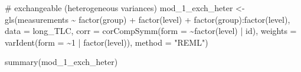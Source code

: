 \documentclass[
  letterpaper,
  DIV=11,
  numbers=noendperiod]{scrreprt}
\newenvironment{Shaded}{\begin{snugshade}}{\end{snugshade}}
\newcommand{\AttributeTok}[1]{\textcolor[rgb]{0.40,0.45,0.13}{#1}}
\newcommand{\CommentTok}[1]{\textcolor[rgb]{0.37,0.37,0.37}{#1}}
\newcommand{\DecValTok}[1]{\textcolor[rgb]{0.68,0.00,0.00}{#1}}
\newcommand{\FunctionTok}[1]{\textcolor[rgb]{0.28,0.35,0.67}{#1}}
\newcommand{\NormalTok}[1]{\textcolor[rgb]{0.00,0.23,0.31}{#1}}
\newcommand{\OtherTok}[1]{\textcolor[rgb]{0.00,0.23,0.31}{#1}}
\newcommand{\SpecialCharTok}[1]{\textcolor[rgb]{0.37,0.37,0.37}{#1}}
\newcommand{\StringTok}[1]{\textcolor[rgb]{0.13,0.47,0.30}{#1}}
\begin{document}
\begin{Shaded}
\begin{Highlighting}[]
\CommentTok{\# exchangeable (heterogeneous variances)}
\NormalTok{mod\_1\_exch\_heter }\OtherTok{\textless{}{-}} \FunctionTok{gls}\NormalTok{(measurements }\SpecialCharTok{\textasciitilde{}} \FunctionTok{factor}\NormalTok{(group) }\SpecialCharTok{+} \FunctionTok{factor}\NormalTok{(level) }\SpecialCharTok{+} \FunctionTok{factor}\NormalTok{(group)}\SpecialCharTok{:}\FunctionTok{factor}\NormalTok{(level),}
    \AttributeTok{data =}\NormalTok{ long\_TLC, }\AttributeTok{corr =} \FunctionTok{corCompSymm}\NormalTok{(}\AttributeTok{form =} \SpecialCharTok{\textasciitilde{}}\FunctionTok{factor}\NormalTok{(level) }\SpecialCharTok{|}\NormalTok{ id), }\AttributeTok{weights =} \FunctionTok{varIdent}\NormalTok{(}\AttributeTok{form =} \SpecialCharTok{\textasciitilde{}}\DecValTok{1} \SpecialCharTok{|}
        \FunctionTok{factor}\NormalTok{(level)), }\AttributeTok{method =} \StringTok{"REML"}\NormalTok{)}

\FunctionTok{summary}\NormalTok{(mod\_1\_exch\_heter)}
\end{Highlighting}
\end{Shaded}
\end{document}
